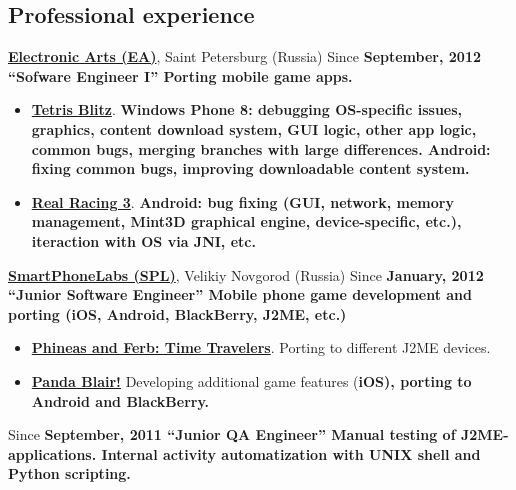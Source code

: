 \begin{flushright}
\section{Professional experience}
{
\fontsize{14pt}{12pt}\selectfont
\href{http://www.ea.com}{\bfseries Electronic Arts (EA)\mdseries},
Saint Petersburg (Russia)
}
\subitem Since \bfseries September, 2012 \mdseries ``Sofware Engineer I''
\subitem Porting mobile game apps.
\begin{itemize}
\setlength{\itemindent}{20pt}
\item
    \href{http://www.windowsphone.com/en-us/store/app/tetris-blitz/806c88c7-528c-4563-9c0a-09ef31f14d61}
    {\bfseries Tetris Blitz\mdseries}. \bfseries Windows Phone 8\mdseries:
debugging OS-specific issues, graphics, content download system,
GUI logic, other app logic, common bugs,
merging branches with large differences.\linebreak
\bfseries Android\mdseries: fixing common bugs,
    improving downloadable content system.
\item
    \href{http://www.facebook.com/realracing}
    {\bfseries Real Racing 3\mdseries}.
    \bfseries Android\mdseries: bug fixing
    (GUI, network, memory management, Mint3D graphical engine,
    device-specific, etc.), iteraction with OS via JNI, etc.
\end{itemize}

{
\vspace{15pt}
\fontsize{14pt}{12pt}\selectfont
\href{http://spl.co}{\bfseries SmartPhoneLabs (SPL)\mdseries},
Velikiy Novgorod (Russia)
}
\subitem Since \bfseries January, 2012 \mdseries ``Junior Software Engineer''
\subitem Mobile phone game development and porting
(iOS, Android, BlackBerry, J2ME, etc.)
\begin{itemize}
\setlength{\itemindent}{20pt}
\item
    \href{http://java.mob.org/game/phineas\_and\_ferb\_time\_travelers.html}
        {\bfseries Phineas and Ferb: Time Travelers\mdseries}.
        Porting to different J2ME devices.
\item
    \href{https://itunes.apple.com/us/app/panda-blair!/id500995558?mt=8}
        {\bfseries Panda Blair!\mdseries}
        Developing additional game features (\bfseries iOS\mdseries),
        porting to \bfseries Android \mdseries and \bfseries BlackBerry\mdseries.
\end{itemize}

\vspace{15pt}
\subitem Since \bfseries September, 2011 \mdseries ``Junior QA Engineer''
\subitem Manual testing of J2ME-applications.
\subitem Internal activity automatization with UNIX shell and Python scripting.


\end{flushright}
